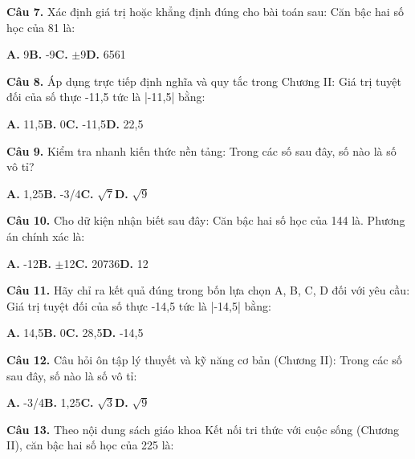 \documentclass[11pt,a4paper]{article}
\begin{document}
\textbf{\color{primary} Câu 7.} Xác định giá trị hoặc khẳng định đúng cho bài toán sau: Căn bậc hai số học của 81 là:\par
\hspace*{1.5em}\textbf{A.} 9\quad\quad \textbf{B.} -9\quad\quad \textbf{C.} $\pm$9\quad\quad \textbf{D.} 6561\par\vspace{2pt}
\textbf{\color{primary} Câu 8.} Áp dụng trực tiếp định nghĩa và quy tắc trong Chương II: Giá trị tuyệt đối của số thực -11,5 tức là |-11,5| bằng:\par
\hspace*{1.5em}\textbf{A.} 11,5\quad\quad \textbf{B.} 0\quad\quad \textbf{C.} -11,5\quad\quad \textbf{D.} 22,5\par\vspace{2pt}
\textbf{\color{primary} Câu 9.} Kiểm tra nhanh kiến thức nền tảng: Trong các số sau đây, số nào là số vô tỉ?\par
\hspace*{1.5em}\textbf{A.} 1,25\quad\quad \textbf{B.} -3/4\quad\quad \textbf{C.} $\sqrt{7}$\quad\quad \textbf{D.} $\sqrt{9}$\par\vspace{2pt}
\textbf{\color{primary} Câu 10.} Cho dữ kiện nhận biết sau đây: Căn bậc hai số học của 144 là. Phương án chính xác là:\par
\hspace*{1.5em}\textbf{A.} -12\quad\quad \textbf{B.} $\pm$12\quad\quad \textbf{C.} 20736\quad\quad \textbf{D.} 12\par\vspace{2pt}
\textbf{\color{primary} Câu 11.} Hãy chỉ ra kết quả đúng trong bốn lựa chọn A, B, C, D đối với yêu cầu: Giá trị tuyệt đối của số thực -14,5 tức là |-14,5| bằng:\par
\hspace*{1.5em}\textbf{A.} 14,5\quad\quad \textbf{B.} 0\quad\quad \textbf{C.} 28,5\quad\quad \textbf{D.} -14,5\par\vspace{2pt}
\textbf{\color{primary} Câu 12.} Câu hỏi ôn tập lý thuyết và kỹ năng cơ bản (Chương II): Trong các số sau đây, số nào là số vô tỉ:\par
\hspace*{1.5em}\textbf{A.} -3/4\quad\quad \textbf{B.} 1,25\quad\quad \textbf{C.} $\sqrt{3}$\quad\quad \textbf{D.} $\sqrt{9}$\par\vspace{2pt}
\textbf{\color{primary} Câu 13.} Theo nội dung sách giáo khoa Kết nối tri thức với cuộc sống (Chương II), căn bậc hai số học của 225 là:\par
\end{document}
